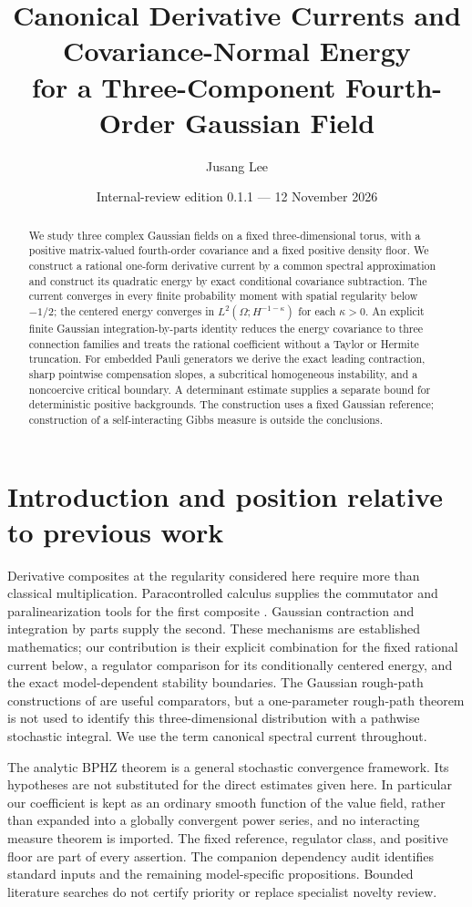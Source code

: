 \documentclass[11pt]{article}
\title{Canonical Derivative Currents and Covariance-Normal Energy\protect\\for a Three-Component Fourth-Order Gaussian Field}
\author{Jusang Lee}
\date{Internal-review edition 0.1.1 --- 12 November 2026}
\begin{document}
\maketitle
\begin{abstract}
We study three complex Gaussian fields on a fixed three-dimensional torus,
with a positive matrix-valued fourth-order covariance and a fixed positive
density floor. We construct a rational one-form derivative current by a
common spectral approximation and construct its quadratic energy by exact
conditional covariance subtraction. The current converges in every finite
probability moment with spatial regularity below $-1/2$; the centered energy
converges in $L^2(\Omega;H^{-1-\kappa})$ for each $\kappa>0$.
An explicit finite Gaussian integration-by-parts identity reduces the energy
covariance to three connection families and treats the rational coefficient
without a Taylor or Hermite truncation. For embedded Pauli generators we
derive the exact leading contraction, sharp pointwise compensation slopes,
a subcritical homogeneous instability, and a noncoercive critical boundary.
A determinant estimate supplies a separate bound for deterministic positive
backgrounds. The construction uses a fixed Gaussian reference; construction
of a self-interacting Gibbs measure is outside the conclusions.
\end{abstract}

\section{Introduction and position relative to previous work}
Derivative composites at the regularity considered here require more than
classical multiplication. Paracontrolled calculus supplies the commutator
and paralinearization tools for the first composite \cite{GIP}. Gaussian
contraction and integration by parts supply the second. These mechanisms
are established mathematics; our contribution is their explicit combination
for the fixed rational current below, a regulator comparison for its
conditionally centered energy, and the exact model-dependent stability
boundaries. The Gaussian rough-path constructions of \cite{FV} are useful
comparators, but a one-parameter rough-path theorem is not used to identify
this three-dimensional distribution with a pathwise stochastic integral.
We use the term canonical spectral current throughout.

The analytic BPHZ theorem \cite{CH} is a general stochastic convergence
framework. Its hypotheses are not substituted for the direct estimates
given here. In particular our coefficient is kept as an ordinary smooth
function of the value field, rather than expanded into a globally convergent
power series, and no interacting measure theorem is imported. The fixed
reference, regulator class, and positive floor are part of every assertion.
The companion dependency audit identifies standard inputs and the remaining
model-specific propositions. Bounded literature searches do not certify
priority or replace specialist novelty review.
\end{document}
